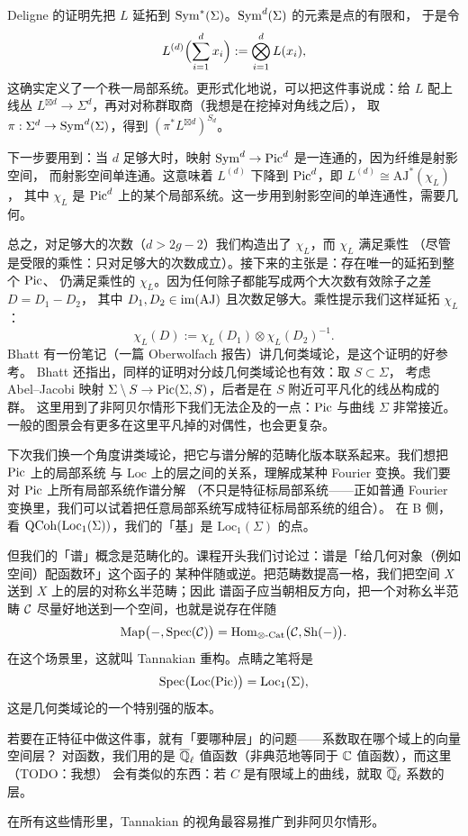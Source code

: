 Deligne 的证明先把 $L$ 延拓到 $\operatorname{Sym}^*(\Sigma)$。$\operatorname{Sym}^d(\Sigma)$ 的元素是点的有限和，
于是令
\[
L^{(d)}\Bigl(\sum_{i=1}^{d}x_i\Bigr):=\bigotimes_{i=1}^{d}L(x_i),
\]
这确实定义了一个秩一局部系统。更形式化地说，可以把这件事说成：给 $L$ 配上线丛
$L^{\boxtimes d}\to\Sigma^d$，再对对称群取商（我想是在挖掉对角线之后），
取 $\pi:\Sigma^d\to\operatorname{Sym}^d(\Sigma)$，得到 $(\pi^*L^{\boxtimes d})^{S_d}$。

下一步要用到：当 $d$ 足够大时，映射 $\operatorname{Sym}^d\to\operatorname{Pic}^d$ 是一连通的，因为纤维是射影空间，
而射影空间单连通。这意味着 $L^{(d)}$ 下降到 $\operatorname{Pic}^d$，即 $L^{(d)}\cong \mathrm{AJ}^*(\chi_L)$，
其中 $\chi_L$ 是 $\operatorname{Pic}^d$ 上的某个局部系统。这一步用到射影空间的单连通性，需要几何。

总之，对足够大的次数（$d>2g-2$）我们构造出了 $\chi_L$，而 $\chi_L$ 满足乘性
（尽管是受限的乘性：只对足够大的次数成立）。接下来的主张是：存在唯一的延拓到整个 $\operatorname{Pic}$、
仍满足乘性的 $\chi_L$。因为任何除子都能写成两个大次数有效除子之差 $D=D_1-D_2$，
其中 $D_1,D_2\in\operatorname{im}(\mathrm{AJ})$ 且次数足够大。乘性提示我们这样延拓 $\chi_L$：
\[
\chi_L(D):=\chi_L(D_1)\otimes \chi_L(D_2)^{-1}.
\]
Bhatt 有一份笔记（一篇 Oberwolfach 报告）讲几何类域论，是这个证明的好参考。
Bhatt 还指出，同样的证明对分歧几何类域论也有效：取 $S\subset\Sigma$，
考虑 Abel–Jacobi 映射 $\Sigma\setminus S\to\operatorname{Pic}(\Sigma,S)$，后者是在 $S$ 附近可平凡化的线丛构成的群。
这里用到了非阿贝尔情形下我们无法企及的一点：$\operatorname{Pic}$ 与曲线 $\Sigma$ 非常接近。
一般的图景会有更多在这里平凡掉的对偶性，也会更复杂。

下次我们换一个角度讲类域论，把它与谱分解的范畴化版本联系起来。我们想把 $\operatorname{Pic}$ 上的局部系统
与 $\mathrm{Loc}$ 上的层之间的关系，理解成某种 Fourier 变换。我们要对 $\operatorname{Pic}$ 上所有局部系统作谱分解
（不只是特征标局部系统——正如普通 Fourier 变换里，我们可以试着把任意局部系统写成特征标局部系统的组合）。
在 B 侧，看 $\mathrm{QCoh}(\mathrm{Loc}_1(\Sigma))$，我们的「基」是 $\mathrm{Loc}_1(\Sigma)$ 的点。

但我们的「谱」概念是范畴化的。课程开头我们讨论过：谱是「给几何对象（例如空间）配函数环」这个函子的
某种伴随或逆。把范畴数提高一格，我们把空间 $X$ 送到 $X$ 上的层的对称幺半范畴；因此
谱函子应当朝相反方向，把一个对称幺半范畴 $\mathcal{C}$ 尽量好地送到一个空间，也就是说存在伴随
\[
\mathrm{Map}\bigl(-,\operatorname{Spec}(\mathcal{C})\bigr)=\operatorname{Hom}_{\otimes\text{-}\mathrm{Cat}}\bigl(\mathcal{C},\mathrm{Sh}(-)\bigr).
\]
在这个场景里，这就叫 Tannakian 重构。点睛之笔将是
\[
\operatorname{Spec}\bigl(\mathrm{Loc}(\operatorname{Pic})\bigr)=\mathrm{Loc}_1(\Sigma),
\]
这是几何类域论的一个特别强的版本。

若要在正特征中做这件事，就有「要哪种层」的问题——系数取在哪个域上的向量空间层？
对函数，我们用的是 $\overline{\mathbb{Q}}_\ell$ 值函数（非典范地等同于 $\mathbb{C}$ 值函数），而这里（TODO：我想）
会有类似的东西：若 $C$ 是有限域上的曲线，就取 $\overline{\mathbb{Q}}_\ell$ 系数的层。

在所有这些情形里，Tannakian 的视角最容易推广到非阿贝尔情形。
